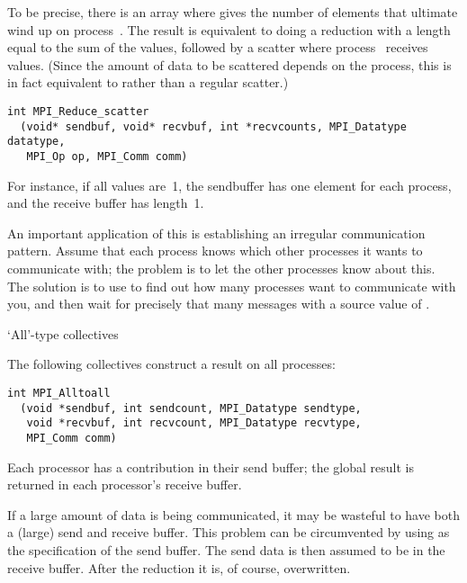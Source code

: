To be precise, there is an array  where  gives
the number of elements that ultimate wind up on process~.
The result is equivalent to doing a reduction with a length equal to the sum
of the  values, followed by a scatter where process~
receives  values. (Since the amount of data to be scattered
depends on the process, this is in fact equivalent to 
rather than a regular scatter.)
\begin{verbatim}
int MPI_Reduce_scatter
  (void* sendbuf, void* recvbuf, int *recvcounts, MPI_Datatype datatype, 
   MPI_Op op, MPI_Comm comm)
\end{verbatim}
For instance, if all  values are~1, the sendbuffer has one element
for each process, and the receive buffer has length~1.

An important application of this is establishing an irregular
communication pattern.  Assume that each process knows which
other processes it wants to communicate with; the problem is to
let the other processes know about this.
The solution is to use  to find out how many processes
want to communicate with you, and then wait for precisely that many messages
with a source value of .

 {`All'-type collectives}

The following collectives construct a result on all processes:
%
%
%
%
\begin{verbatim}
int MPI_Alltoall
  (void *sendbuf, int sendcount, MPI_Datatype sendtype, 
   void *recvbuf, int recvcount, MPI_Datatype recvtype, 
   MPI_Comm comm)
\end{verbatim}
Each processor has a contribution in their send buffer; the global result
is returned in each processor's receive buffer.

If a large amount of data is being communicated, it may be wasteful to 
have both a (large) send and receive buffer.
This problem can be circumvented by using 
as the specification of the send buffer. The send data is then
assumed to be in the receive buffer. After the reduction it is, of course,
overwritten.

